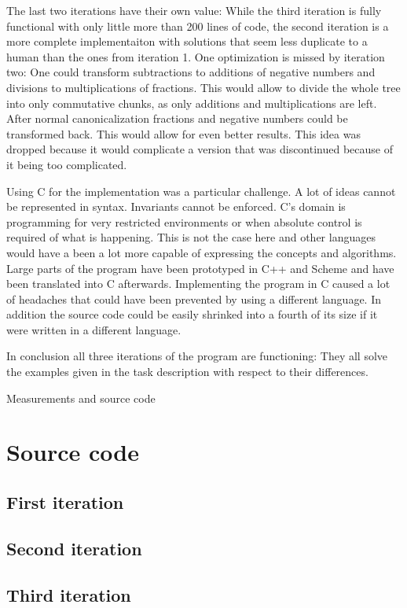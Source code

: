 \documentclass[11pt,a4paper]{article}
\begin{document}
The last two iterations have their own value:
While the third iteration is fully functional with only little more
than 200 lines of code, the second iteration is a more complete
implementaiton with solutions that seem less duplicate to a human than
the ones from iteration 1.
One optimization is missed by iteration two: One could transform
subtractions to additions of negative numbers and divisions to
multiplications of fractions.
This would allow to divide the whole tree into only commutative
chunks, as only additions and multiplications are left.
After normal canonicalization fractions and negative numbers could be
transformed back.
This would allow for even better results.
This idea was dropped because it would complicate a version that was
discontinued because of it being too complicated.

Using C for the implementation was a particular challenge.
A lot of ideas cannot be represented in syntax. Invariants cannot be
enforced. C's domain is programming for very restricted environments
or when absolute control is required of what is happening.
This is not the case here and other languages would have a been a lot
more capable of expressing the concepts and algorithms.
Large parts of the program have been prototyped in C++ and Scheme and
have been translated into C afterwards.
Implementing the program in C caused a lot of headaches that could
have been prevented by using a different language.
In addition the source code could be easily shrinked into a fourth of
its size if it were written in a different language.

In conclusion all three iterations of the program are functioning:
They all solve the examples given in the task description with respect
to their differences.




\FloatBarrier
\clearpage
\huge{Measurements and source code}

\section{Source code}
\label{sec:src}
\subsection{First iteration}



\subsection{Second iteration}



\subsection{Third iteration}


\end{document}

